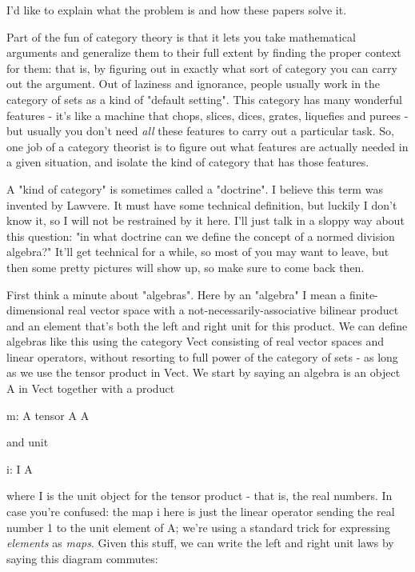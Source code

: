I'd like to explain what the problem is and how these papers solve it.

Part of the fun of category theory is that it lets you take mathematical
arguments and generalize them to their full extent by finding the proper
context for them: that is, by figuring out in exactly what sort of
category you can carry out the argument.  Out of laziness and ignorance,
people usually work in the category of sets as a kind of "default
setting".  This category has many wonderful features - it's like a 
machine that chops, slices, dices, grates, liquefies and purees - but 
usually you don't need \emph{all} these features to carry out a particular
task.  So, one job of a category theorist is to figure out what
features are actually needed in a given situation, and isolate the
kind of category that has those features.  

A "kind of category" is sometimes called a
"doctrine".  I believe this term was invented by Lawvere.  It
must have some technical definition, but luckily I don't know it, so I
will not be restrained by it here.  I'll just talk in a sloppy way about
this question: "in what doctrine can we define the concept of a
normed division algebra?" It'll get technical for a while, so most
of you may want to leave, but then some pretty pictures will show up, so
make sure to come back then.

First think a minute about "algebras".  Here by an
"algebra" I mean a finite-dimensional real vector space with a
not-necessarily-associative bilinear product and an element that's both
the left and right unit for this product.  We can define algebras like
this using the category Vect consisting of real vector spaces and linear
operators, without resorting to full power of the category of sets - as
long as we use the tensor product in Vect.  We start by saying an
algebra is an object A in Vect together with a product

m: A tensor A \to  A

and unit 

i: I \to  A

where I is the unit object for the tensor product - that is, the real 
numbers.  In case you're confused: the map i here is just the linear 
operator sending the real number 1 to the unit element of A; we're using 
a standard trick for expressing \emph{elements} as \emph{maps}.  
Given this stuff,
we can write the left and right unit laws by saying this diagram commutes:



